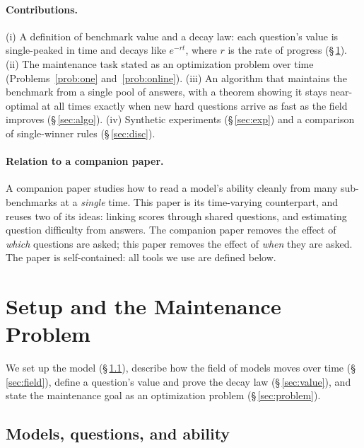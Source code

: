 \documentclass[11pt]{article}
\theoremstyle{plain}
\theoremstyle{definition}
\theoremstyle{remark}
\begin{document}
\paragraph{Contributions.} (i) A definition of benchmark value and a decay law: each
question's value is single-peaked in time and decays like $e^{-rt}$, where $r$ is the
rate of progress (\S\,\ref{sec:setup}). (ii) The maintenance task stated as an
optimization problem over time (Problems~\ref{prob:one} and~\ref{prob:online}).
(iii) An algorithm that maintains the benchmark from a single pool of answers, with a
theorem showing it stays near-optimal at all times exactly when new hard questions
arrive as fast as the field improves (\S\,\ref{sec:algo}). (iv) Synthetic experiments
(\S\,\ref{sec:exp}) and a comparison of single-winner rules (\S\,\ref{sec:disc}).

\paragraph{Relation to a companion paper.} A companion paper studies how to read a
model's ability cleanly from many sub-benchmarks at a \emph{single} time. This paper
is its time-varying counterpart, and reuses two of its ideas: linking scores through
shared questions, and estimating question difficulty from answers. The companion
paper removes the effect of \emph{which} questions are asked; this paper removes the
effect of \emph{when} they are asked. The paper is self-contained: all tools we use
are defined below.

\section{Setup and the Maintenance Problem}
\label{sec:setup}

We set up the model (\S\,\ref{sec:model}), describe how the field of models moves over
time (\S\,\ref{sec:field}), define a question's value and prove the decay law
(\S\,\ref{sec:value}), and state the maintenance goal as an optimization problem
(\S\,\ref{sec:problem}).

\subsection{Models, questions, and ability}
\label{sec:model}
\end{document}
